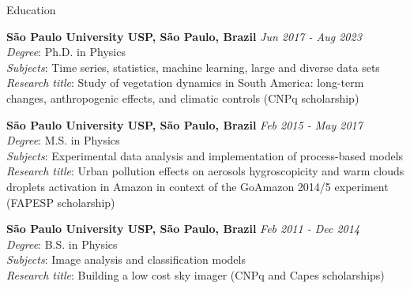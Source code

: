 \documentclass{resume} %
\begin{document}

\begin{rSection}{Education}

{\bf São Paulo University USP, São Paulo, Brazil} \hfill {\em Jun 2017 - Aug 2023} \\
\textit{Degree}: Ph.D. in Physics \\
\textit{Subjects}: Time series, statistics, machine learning, large and diverse data sets  \\
\textit{Research title}: Study of vegetation dynamics in South America: long-term changes, anthropogenic effects, and climatic controls (CNPq scholarship)

{\bf São Paulo University USP, São Paulo, Brazil} \hfill {\em Feb 2015 - May 2017} \\
\textit{Degree}: M.S. in Physics \\
\textit{Subjects}: Experimental data analysis and implementation of process-based models \\
\textit{Research title}: Urban pollution effects on aerosols hygroscopicity and warm clouds droplets activation in Amazon in context of the GoAmazon 2014/5 experiment (FAPESP scholarship) 

{\bf São Paulo University USP, São Paulo, Brazil} \hfill {\em Feb 2011 - Dec 2014} \\
\textit{Degree}: B.S. in Physics \\
\textit{Subjects}: Image analysis and classification models \\
\textit{Research title}: Building a low cost sky imager (CNPq and Capes scholarships) 

\end{rSection}

\end{document}

